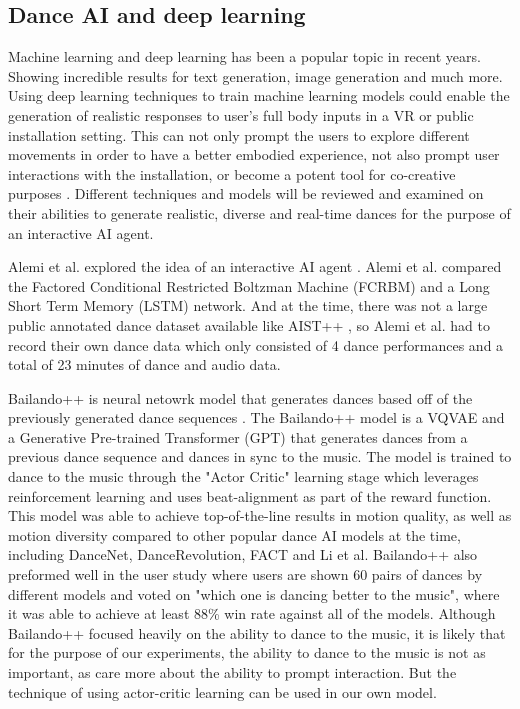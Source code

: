 \documentclass[final,5p,times,twocolumn,authoryear]{article}
\begin{document}
\subsection{Dance AI and deep learning}

Machine learning and deep learning has been a popular topic in recent
years. Showing incredible results for text generation, image generation
and much more.  Using deep learning techniques to train machine learning
models could enable the generation of realistic responses to user's full
body inputs in a VR or public installation setting.  This can not only
prompt the users to explore different movements in order to have a
better embodied experience, not also prompt user interactions with the
installation, or become a potent tool for co-creative purposes
\cite{Wallace2023}.  Different techniques and models will be reviewed
and examined on their abilities to generate realistic, diverse and
real-time dances for the purpose of an interactive AI agent.

Alemi et al. explored the idea of an interactive AI agent
\cite{Alemi2017}. Alemi et al. compared the Factored Conditional
Restricted Boltzman Machine (FCRBM) and a Long Short Term Memory (LSTM)
network. And at the time, there was not a large public annotated dance
dataset available like AIST++ \cite{Li2021}, so Alemi et al. had to
record their own dance data which only consisted of 4 dance performances
and a total of 23 minutes of dance and audio data.

Bailando++ is neural netowrk model that generates dances based off of
the previously generated dance sequences \cite{Siyao2023}. The
Bailando++ model is a VQVAE and a Generative Pre-trained Transformer
(GPT) that generates dances from a previous dance sequence and dances in sync
to the music. The model is trained to dance to the music through
the "Actor Critic" learning stage which leverages
reinforcement learning and uses beat-alignment as part of the reward function. This
model was able to achieve top-of-the-line results in motion quality, as
well as motion diversity compared to other
popular dance AI models at the time, including DanceNet,
DanceRevolution, FACT and Li et al. Bailando++ also preformed well in
the user study where users are shown 60 pairs of dances by different
models and voted on "which one is dancing better to the music", where it
was able to achieve at least 88\% win rate against all of the models.
Although Bailando++ focused heavily on the ability to dance to the
music, it is likely that for the purpose of our experiments, the ability
to dance to the music is not as important, as care more about the
ability to prompt interaction. But the technique of using actor-critic
learning can be used in our own model.
\end{document}
